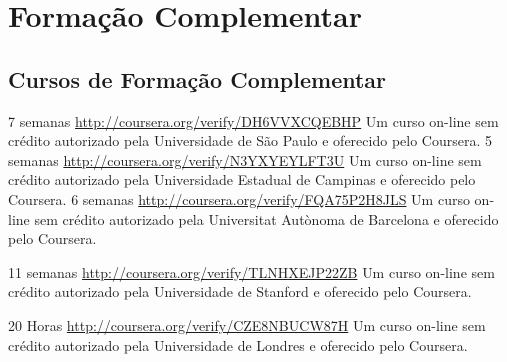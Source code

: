 \documentclass[11pt,a4paper,sans]{moderncv} %
\begin{document}
\section{Formação Complementar}

\subsection{ Cursos de Formação Complementar }
	      {7 semanas}
	      {\url{http://coursera.org/verify/DH6VVXCQEBHP}}{}
	      {Um curso on-line sem crédito autorizado pela Universidade de São Paulo e oferecido pelo Coursera.}
	      {5 semanas}
	      {\url{http://coursera.org/verify/N3YXYEYLFT3U}}{}
	      {Um curso on-line sem crédito autorizado pela Universidade Estadual de Campinas e oferecido pelo Coursera.}
	      {6 semanas}
	      {\url{http://coursera.org/verify/FQA75P2H8JLS}}{}
	      {Um curso on-line sem crédito autorizado pela Universitat Autònoma de Barcelona e oferecido pelo Coursera.}

	      {11 semanas}
	      {\url{http://coursera.org/verify/TLNHXEJP22ZB}}{}
	      {Um curso on-line sem crédito autorizado pela Universidade de Stanford e oferecido pelo Coursera.}

	      {20 Horas}
	      {\url{http://coursera.org/verify/CZE8NBUCW87H}}{}
	      {Um curso on-line sem crédito autorizado pela Universidade de Londres e oferecido pelo Coursera.}




\end{document}

